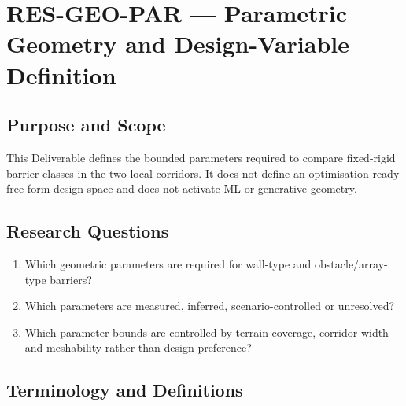 
\section{RES-GEO-PAR --- Parametric Geometry and Design-Variable Definition}
\label{sec:res-geo-par}

\subsection{Purpose and Scope}
\label{sec:res-geo-par-purpose}

This Deliverable defines the bounded parameters required to compare
fixed-rigid barrier classes in the two local corridors. It does not
define an optimisation-ready free-form design space and does not
activate ML or generative geometry.

\subsection{Research Questions}
\label{sec:res-geo-par-research-questions}

\begin{enumerate}
  \item Which geometric parameters are required for wall-type and
    obstacle/array-type barriers?
  \item Which parameters are measured, inferred, scenario-controlled or
    unresolved?
  \item Which parameter bounds are controlled by terrain coverage,
    corridor width and meshability rather than design preference?
\end{enumerate}

\subsection{Terminology and Definitions}
\label{sec:res-geo-par-definitions}



